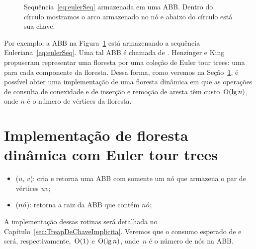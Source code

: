 \begin{figure}[htb]
\centering
\caption{Sequência~\eqref{eq:eulerSeq}  armazenada em uma ABB. Dentro do círculo mostramos o arco armazenado no nó e abaixo do círculo está sua chave.}
\label{fig:seq-treap-indices}
\end{figure}

Por exemplo, a ABB na Figura~\ref{fig:seq-treap-indices} está armazenando a sequência Euleriana~\eqref{eq:eulerSeq}.
Uma tal ABB é chamada de . 
Henzinger e King propuseram representar uma floresta por uma coleção de Euler tour trees: uma para cada componente da floresta. 
Dessa forma, como veremos na Seção~\ref{sec:impleDF-ETT}, é possível obter uma implementação de uma floresta dinâmica em que as operações de consulta de conexidade e de inserção e remoção de aresta têm custo~$\mathrm{O}(\lg n)$, onde $n$ é o número de vértices da floresta.


\section{Implementação de floresta dinâmica com Euler tour trees}
\label{sec:impleDF-ETT}


\begin{itemize}
\item  \treapCreate($u$, $v$): cria e retorna uma ABB com somente um nó que armazena o par de vértices $uv$;
\item \treapGetRoot($n\acute{o}$): retorna a raiz da ABB que contém $n\acute{o}$;
\end{itemize}

A implementação dessas rotinas será detalhada no Capítulo~\ref{sec:TreapDeChaveImplicita}. Veremos que o consumo esperado de \treapCreate{} e \treapGetRoot{} será, respectivamente,~$\mathrm{O}(1)$ e~$\mathrm{O}(\lg n)$, onde~$n$ é o número de nós na ABB.


